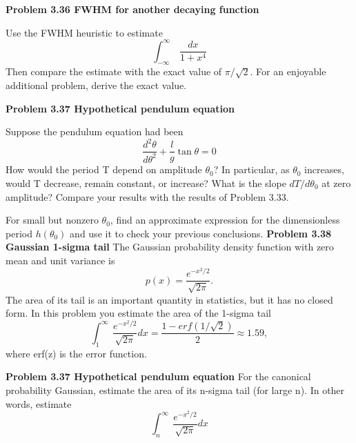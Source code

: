 \documentclass[a4paper, 11pt]{book}
\begin{document}
    \colorbox{light-gray}{
    \begin{minipage}{\textwidth}
    \large\textbf{Problem 3.36 FWHM for another decaying function}

    Use the FWHM heuristic to estimate
    \begin{equation}\int_{-\infty}^\infty\ \frac{dx}{1+x^4}\end{equation}
    Then compare the estimate with the exact value of $\pi/\sqrt{2}$. For an enjoyable
    additional problem, derive the exact value.

    \large\textbf{Problem 3.37 Hypothetical pendulum equation}

    Suppose the pendulum equation had been
    \begin{equation}\frac{d^2\theta}{d\theta^2} + \frac{l}{g}\tan \theta=0\end{equation}
    How would the period T depend on amplitude $\theta_{0}$? In particular, as $\theta_{0}$ increases,
    would T decrease, remain constant, or increase? What is the slope $dT/d\theta_{0}$ at
    zero amplitude? Compare your results with the results of Problem 3.33.

    For small but nonzero $\theta_{0}$, find an approximate expression for the dimensionless
    period $h(\theta_{0})$ and use it to check your previous conclusions.
    \large\textbf{Problem 3.38 Gaussian 1-sigma tail}
    The Gaussian probability density function with zero mean and unit variance is
    \begin{equation}p(x)=\frac{e^{-x^2/2}}{\sqrt{2\pi}}.\end{equation}
    The area of its tail is an important quantity in statistics, but it has no closed form.
    In this problem you estimate the area of the 1-sigma tail
    \begin{equation}\int_{1}^\infty\ \frac{e^{-x^2/2}}{\sqrt{2\pi}}dx=\frac{1-erf(1/\sqrt{2})}{2}\approx 1.59,\end{equation}
    where erf(z) is the error function.

    \large\textbf{Problem 3.37 Hypothetical pendulum equation}
    For the canonical probability Gaussian, estimate the area of its n-sigma tail (for
    large n). In other words, estimate
    \begin{equation}\int_{n}^\infty\ \frac{e^{-x^2/2}}{\sqrt{2\pi}} dx\end{equation}
    \end{minipage}
    }
    
\end{document}
